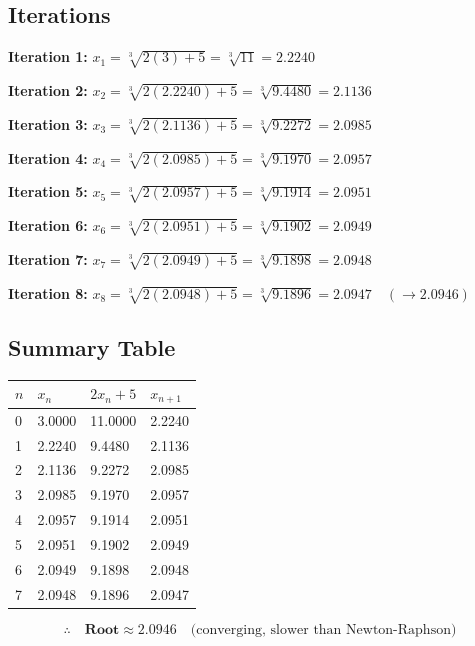 \documentclass[12pt]{article}
\newcommand{\hcell}[1]{\textbf{\color{white}#1}}
\begin{document}
\vspace{6pt}
\subsection*{Iterations}

\medskip
\noindent\textbf{Iteration 1:}\quad
$x_1 = \sqrt[3]{2(3)+5} = \sqrt[3]{11} = \mathbf{2.2240}$

\medskip
\noindent\textbf{Iteration 2:}\quad
$x_2 = \sqrt[3]{2(2.2240)+5} = \sqrt[3]{9.4480} = \mathbf{2.1136}$

\medskip
\noindent\textbf{Iteration 3:}\quad
$x_3 = \sqrt[3]{2(2.1136)+5} = \sqrt[3]{9.2272} = \mathbf{2.0985}$

\medskip
\noindent\textbf{Iteration 4:}\quad
$x_4 = \sqrt[3]{2(2.0985)+5} = \sqrt[3]{9.1970} = \mathbf{2.0957}$

\medskip
\noindent\textbf{Iteration 5:}\quad
$x_5 = \sqrt[3]{2(2.0957)+5} = \sqrt[3]{9.1914} = \mathbf{2.0951}$

\medskip
\noindent\textbf{Iteration 6:}\quad
$x_6 = \sqrt[3]{2(2.0951)+5} = \sqrt[3]{9.1902} = \mathbf{2.0949}$

\medskip
\noindent\textbf{Iteration 7:}\quad
$x_7 = \sqrt[3]{2(2.0949)+5} = \sqrt[3]{9.1898} = \mathbf{2.0948}$

\medskip
\noindent\textbf{Iteration 8:}\quad
$x_8 = \sqrt[3]{2(2.0948)+5} = \sqrt[3]{9.1896} = \mathbf{2.0947}\quad(\to 2.0946)$

\subsection*{Summary Table}
\begin{center}
\begin{tabular}{C{0.8cm} C{2.5cm} C{3.5cm} C{2.5cm}}
\toprule
{}
\hcell{$n$} & \hcell{$x_n$} & \hcell{$2x_n+5$} & \hcell{$x_{n+1}$} \\
\midrule
{}
0 & 3.0000 & 11.0000 & 2.2240 \\
1 & 2.2240 &  9.4480 & 2.1136 \\
2 & 2.1136 &  9.2272 & 2.0985 \\
3 & 2.0985 &  9.1970 & 2.0957 \\
4 & 2.0957 &  9.1914 & 2.0951 \\
5 & 2.0951 &  9.1902 & 2.0949 \\
6 & 2.0949 &  9.1898 & 2.0948 \\
7 & 2.0948 &  9.1896 & 2.0947 \\
\bottomrule
\end{tabular}
\end{center}
\[
  \therefore\quad \textbf{Root} \approx \mathbf{2.0946} \quad\text{(converging, slower than Newton-Raphson)}
\]
\end{document}
